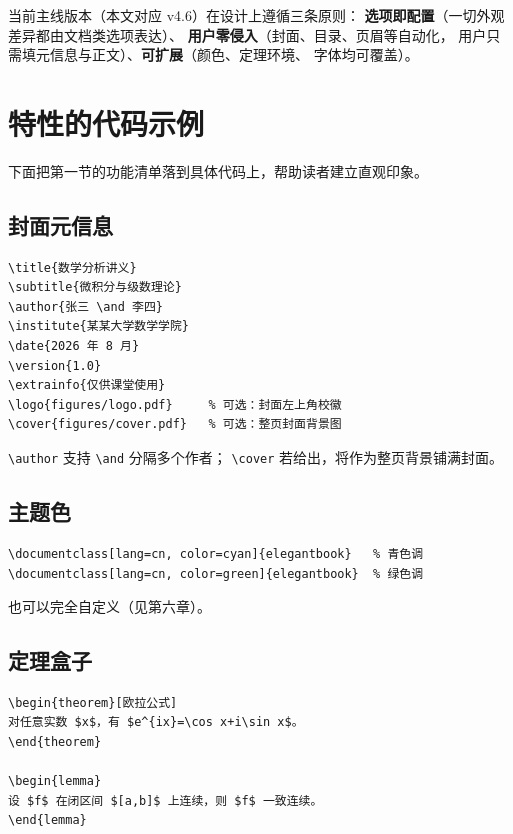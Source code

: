 当前主线版本（本文对应 v4.6）在设计上遵循三条原则：
\textbf{选项即配置}（一切外观差异都由文档类选项表达）、
\textbf{用户零侵入}（封面、目录、页眉等自动化，
用户只需填元信息与正文）、\textbf{可扩展}（颜色、定理环境、
字体均可覆盖）。

\section{特性的代码示例}

下面把第一节的功能清单落到具体代码上，帮助读者建立直观印象。

\subsection{封面元信息}

\begin{lstlisting}
\title{数学分析讲义}
\subtitle{微积分与级数理论}
\author{张三 \and 李四}
\institute{某某大学数学学院}
\date{2026 年 8 月}
\version{1.0}
\extrainfo{仅供课堂使用}
\logo{figures/logo.pdf}     % 可选：封面左上角校徽
\cover{figures/cover.pdf}   % 可选：整页封面背景图
\end{lstlisting}

\verb|\author| 支持 \verb|\and| 分隔多个作者；
\verb|\cover| 若给出，将作为整页背景铺满封面。

\subsection{主题色}

\begin{lstlisting}
\documentclass[lang=cn, color=cyan]{elegantbook}   % 青色调
\documentclass[lang=cn, color=green]{elegantbook}  % 绿色调
\end{lstlisting}

也可以完全自定义（见第六章）。

\subsection{定理盒子}

\begin{lstlisting}
\begin{theorem}[欧拉公式]
对任意实数 $x$，有 $e^{ix}=\cos x+i\sin x$。
\end{theorem}

\begin{lemma}
设 $f$ 在闭区间 $[a,b]$ 上连续，则 $f$ 一致连续。
\end{lemma}
\end{lstlisting}

